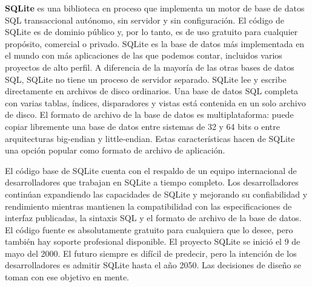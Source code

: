 \textbf{SQLite}  es una biblioteca en proceso que implementa un motor de base de datos SQL transaccional autónomo, sin servidor y sin configuración. El código de SQLite es de dominio público y, por lo tanto, es de uso gratuito para cualquier propósito, comercial o privado. SQLite es la base de datos más implementada en el mundo con más aplicaciones de las que podemos contar, incluidos varios proyectos de alto perfil. A diferencia de la mayoría de las otras bases de datos SQL, SQLite no tiene un proceso de servidor separado. SQLite lee y escribe directamente en archivos de disco ordinarios. Una base de datos SQL completa con varias tablas, índices, disparadores y vistas está contenida en un solo archivo de disco. El formato de archivo de la base de datos es multiplataforma: puede copiar libremente una base de datos entre sistemas de 32 y 64 bits o entre arquitecturas big-endian y little-endian. Estas características hacen de SQLite una opción popular como formato de archivo de aplicación. 

El código base de SQLite cuenta con el respaldo de un equipo internacional de desarrolladores que trabajan en SQLite a tiempo completo. Los desarrolladores continúan expandiendo las capacidades de SQLite y mejorando su confiabilidad y rendimiento mientras mantienen la compatibilidad con las especificaciones de interfaz publicadas, la sintaxis SQL y el formato de archivo de la base de datos. El código fuente es absolutamente gratuito para cualquiera que lo desee, pero también hay soporte profesional disponible. El proyecto SQLite se inició el 9 de mayo del 2000. El futuro siempre es difícil de predecir, pero la intención de los desarrolladores es admitir SQLite hasta el año 2050. Las decisiones de diseño se toman con ese objetivo en mente.

